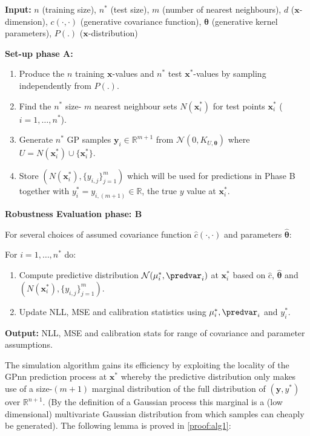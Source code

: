   \begin{algorithm}[ht]
    \;\textbf{Input:} $n$ (training size), $n^*$ (test size), $m$ (number of nearest neighbours), $d$ ($\bm{x}$-dimension), $c(\cdot,\cdot)$ (generative covariance function), $\bm{\theta}$ (generative kernel parameters), $P(.)$ ($\bm{x}$-distribution) 
    
     \;\textbf{Set-up phase A:}
     \begin{enumerate}
       \item Produce the $n$ training $\bm{x}$-values and $n^*$ test $\bm{x}^*$-values by sampling independently from $P(.)$.
       \item Find the $n^*$ size- $m$ nearest neighbour sets $N(\bm{x}_i^*)$ for test points $\bm{x}_i^*$ ($i = 1,\dots,n^*$).
       \item Generate $n^*$ GP samples $\bm{y}_i \in \mathbb{R}^{m+1}$ from $\mathcal{N}(0,K_{U,\bm{\theta}})$ where
       $U = N(\bm{x}_i^*) \cup \{\bm{x}_i^*\}$.
       \item Store $(N(\bm{x}_i^*),\{y_{i,j}\}_{j=1}^m)$ which will be used for predictions in Phase B together with $y_i^* = y_{i,(m+1)} \in \mathbb{R}$, the true $y$ value at $\bm{x}_i^*$.
     \end{enumerate}
     \;\textbf{Robustness Evaluation phase: B}

     \quad For several choices of assumed covariance function $\hat{c}(\cdot,\cdot)$ and parameters $\hat{\bm{\theta}}$: 
     
     \quad For $i=1,\dots,n^*$ do:
     \begin{enumerate}
       \item Compute predictive distribution $\mathcal{N}(\mu_i^*,\predvar_i)$ at $\bm{x}_i^*$ based on $\hat{c}$, $\hat{\bm{\theta}}$ and $(N(\bm{x}_i^*),\{y_{i,j}\}_{j=1}^m)$.
      \item Update NLL, MSE and calibration statistics using $\mu_i^*,\predvar_i$ and $y_i^*$.
     \end{enumerate}
     \;\textbf{Output:} NLL, MSE and calibration stats for range of covariance and parameter assumptions. 
     \caption{Simulation of GPnn Robustness and Limiting Behaviour}
     \label{alg:gpnn_robust_sim}
   \end{algorithm}
The simulation algorithm gains its efficiency by exploiting the locality of the GPnn prediction process at $\bm{x}^*$ whereby the predictive distribution only makes use of a size-$(m+1)$ marginal distribution of the full distribution of $(\bm{y},y^*)$ over $\mathbb{R}^{n+1}$. (By the definition of a Gaussian process this marginal is a (low dimensional) multivariate Gaussian distribution from which samples can cheaply be generated). The following lemma is proved in \autoref{proof:alg1}:

